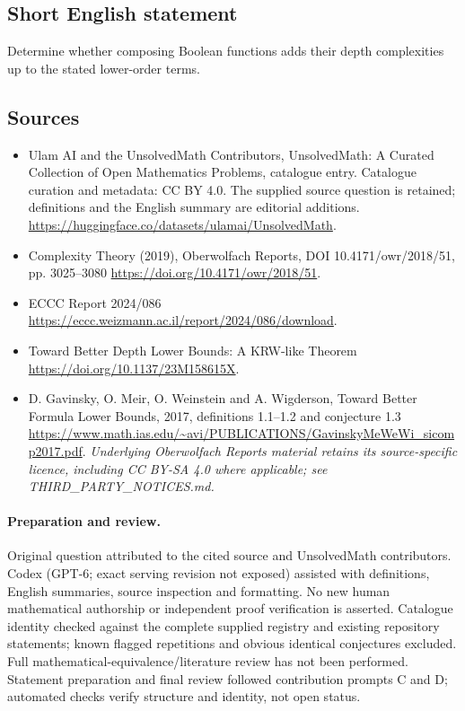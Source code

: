 \documentclass[11pt]{article}
\begin{document}
\subsection{Short English statement}
Determine whether composing Boolean functions adds their depth complexities up to the stated lower-order terms.
\subsection{Sources}
\begin{itemize}
\item[\hypertarget{source:statement:1}{S1}] Ulam AI and the UnsolvedMath Contributors, UnsolvedMath: A Curated Collection of Open Mathematics Problems, catalogue entry. Catalogue curation and metadata: CC BY 4.0. The supplied source question is retained; definitions and the English summary are editorial additions.
\url{https://huggingface.co/datasets/ulamai/UnsolvedMath}.
\item[\hypertarget{source:statement:2}{S2}] Complexity Theory (2019), Oberwolfach Reports, DOI 10.4171/owr/2018/51, pp. 3025--3080
\url{https://doi.org/10.4171/owr/2018/51}.
\item[\hypertarget{source:statement:3}{S3}] ECCC Report 2024/086
\url{https://eccc.weizmann.ac.il/report/2024/086/download}.
\item[\hypertarget{source:statement:4}{S4}] Toward Better Depth Lower Bounds: A KRW-like Theorem
\url{https://doi.org/10.1137/23M158615X}.
\item[\hypertarget{source:statement:5}{S5}] D. Gavinsky, O. Meir, O. Weinstein and A. Wigderson, Toward Better Formula Lower Bounds, 2017, definitions 1.1--1.2 and conjecture 1.3
\url{https://www.math.ias.edu/~avi/PUBLICATIONS/GavinskyMeWeWi_sicomp2017.pdf}.
\textit{Underlying Oberwolfach Reports material retains its source-specific licence, including CC BY-SA 4.0 where applicable; see THIRD\_PARTY\_NOTICES.md.}
\end{itemize}
\paragraph{Preparation and review.}
Original question attributed to the cited source and UnsolvedMath contributors. Codex (GPT-6; exact serving revision not exposed) assisted with definitions, English summaries, source inspection and formatting. No new human mathematical authorship or independent proof verification is asserted. Catalogue identity checked against the complete supplied registry and existing repository statements; known flagged repetitions and obvious identical conjectures excluded. Full mathematical-equivalence/literature review has not been performed. Statement preparation and final review followed contribution prompts C and D; automated checks verify structure and identity, not open status.
\label{end:statement}
\end{document}
